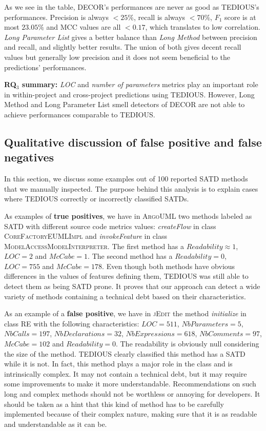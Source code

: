 As we see in the table, DECOR's performances are never as good as TEDIOUS's performances. Precision is always $<25\%$, recall is always $<70\%$, $F_1$ score is at most $23.05\%$ and MCC values are all $<0.17$, which translates to low correlation. \textit{Long Parameter List} gives a better balance than \textit{Long Method} between precision and recall, and slightly better results. The union of both gives decent recall values but generally low precision and it does not seem beneficial to the predictions' performances.

\begin{mdframed}
	{\bf RQ$_3$ summary:} \textit{LOC} and \textit{number of parameters} metrics play an important role in within-project and cross-project predictions using TEDIOUS. However, Long Method and Long Parameter List smell detectors of DECOR are not able to achieve performances comparable to TEDIOUS.
\end{mdframed}

\subsection{Qualitative discussion of false positive and false negatives}


In this section, we discuss some examples out of 100 reported SATD methods that we manually inspected. The purpose behind this analysis is to explain cases where TEDIOUS correctly or incorrectly classified SATDs.

As examples of \textbf{true positives}, we have in \textsc{ArgoUML} two methods labeled as SATD with different source code metrics values: \textit{createFlow} in class \textsc{CoreFactoryEUMLImpl} and \textit{invokeFeature} in class \textsc{ModelAccessModelInterpreter}. The first method has a $Readability\approx1$, $LOC=2$ and $McCabe=1$. The second method has a $Readability=0$, $LOC=755$ and $McCabe=178$. Even though both methods have obvious differences in the values of features defining them, TEDIOUS was still able to detect them as being SATD prone. It proves that our approach can detect a wide variety of methods containing a technical debt based on their characteristics.

As an example of a \textbf{false positive}, we have in \textsc{jEdit} the method \textit{initialize} in class \textsc{RE} with the following characteristics: $LOC=511$, $NbParameters=5$, $NbCalls=197$, $NbDeclarations=32$, $NbExpressions=618$, $NbComments=97$, $McCabe=102$ and $Readability=0$. The readability is obviously null considering the size of the method. TEDIOUS clearly classified this method has a SATD while it is not. In fact, this method plays a major role in the class and is intrinsically complex. It may not contain a technical debt, but it may require some improvements to make it more understandable. Recommendations on such long and complex methods should not be worthless or annoying for developers. It should be taken as a hint that this kind of method has to be carefully implemented because of their complex nature, making sure that it is as readable and understandable as it can be. 

